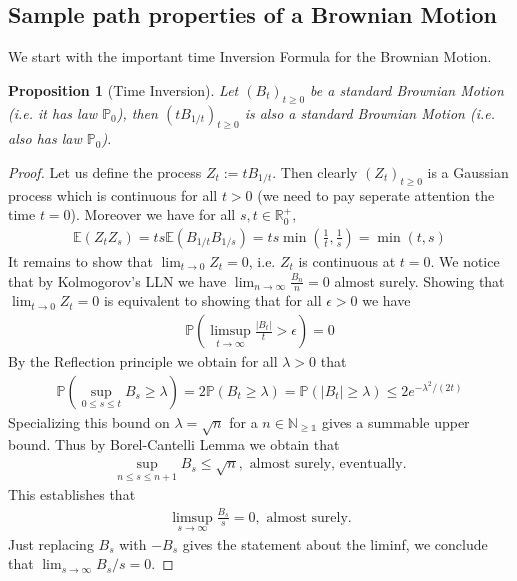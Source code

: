 \documentclass[11pt,a4paper, final]{article}
\newtheorem{prop}{Proposition}[section]
\theoremstyle{definition}
\begin{document}
\subsection{Sample path properties of a Brownian Motion}
We start with the important time Inversion Formula for the Brownian Motion.
\begin{prop}[Time Inversion] Let $(B_t)_{t \geq 0}$ be a standard Brownian Motion (i.e. it has law $\mathbb{P}_0$), then $(t B_{1/t})_{t \geq 0}$ is also a standard Brownian Motion (i.e. also has law $\mathbb{P}_0$). 
\end{prop}
\begin{proof}
Let us define the process $Z_t:= t B_{1/t}$. Then clearly $(Z_t)_{t \geq 0}$ is a Gaussian process which is continuous for all $t>0$ (we need to pay seperate attention the time $t=0$). Moreover we have for all $s,t \in \mathbb{R}_0^+$,
\begin{align*}
\mathbb{E}(Z_tZ_s)= ts \mathbb{E}(B_{1/t}B_{1/s}) = ts \min \left( \frac{1}{t}, \frac{1}{s} \right) = \min (t, s ) 
\end{align*}
It remains to show that $\lim_{t \to 0} Z_t=0$, i.e. $Z_t$ is continuous at $t=0$. We notice that by Kolmogorov's LLN we have $\lim_{n \to \infty} \frac{B_n}{n}=0$ almost surely. Showing that $\lim_{t \to 0} Z_t =0$ is equivalent to showing that for all $\epsilon >0$ we have 
\begin{align*}
\mathbb{P}\left( \limsup_{t \to \infty} \frac{|B_t|}{t} > \epsilon \right) =0 
\end{align*}
\newpage
By the Reflection principle we obtain for all $\lambda >0$ that 
\begin{align*}
\mathbb{P}\left( \sup_{0 \leq s \leq t }  B_s \geq \lambda \right) = 2 \mathbb{P}( B_t \geq \lambda) = \mathbb{P}( |B_t| \geq \lambda) \leq 2 e^{- \lambda^2/ (2t)}
\end{align*}
Specializing this bound on $\lambda= \sqrt{n}$ for a $n \in \mathbb{N_{\geq 1}}$ gives a summable upper bound. Thus by Borel-Cantelli Lemma we obtain that 
\begin{align*}
\sup_{n \leq s \leq n+1} B_s \leq \sqrt{n}, \text{ almost surely, eventually}. 
\end{align*}
This establishes that 
\begin{align*}
\limsup_{s \to \infty} \frac{B_s}{s} = 0, \text{ almost surely}. 
\end{align*}
Just replacing $B_s$ with $-B_s$ gives the statement about the liminf, we conclude that $\lim_{s \to \infty} B_s/s =0. $
\end{proof}
\end{document}
